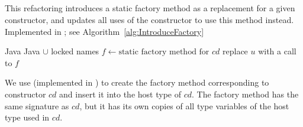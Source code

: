 \subsection{}
This refactoring introduces a static factory method as a replacement for a given constructor, and updates all uses of the constructor to use this method instead. Implemented in ; see Algorithm~\ref{alg:IntroduceFactory}

\begin{algorithm}[p]
\caption{$\refactoring{Introduce Factory}(cd : \type{ConstructorDecl})$}
\label{alg:IntroduceFactory}
\begin{algorithmic}[1]
\REQUIRE Java
\ENSURE Java $\cup$ locked names
\medskip
\STATE $f \leftarrow \text{static factory method for $cd$}$
    \STATE replace $u$ with a call to $f$
  \ENDIF
\ENDFOR
\end{algorithmic}
\end{algorithm}

We use  (implemented in ) to create the factory method corresponding to constructor $cd$ and insert it into the host type of $cd$. The factory method has the same signature as $cd$, but it has its own copies of all type variables of the host type used in $cd$.
